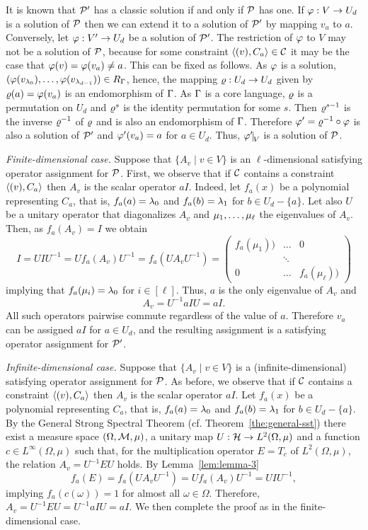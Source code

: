 \documentclass[11pt,letter]{article}
\begin{document}
It is known \cite{Jeavons99:expressive} that ${\mathcal P}'$ has a classic solution if and only if ${\mathcal P}$ has one. If $\varphi:V\to U_d$ is a solution of ${\mathcal P}$ then we can extend it to a solution of ${\mathcal P}'$ by mapping $v_a$ to $a$. Conversely, let $\varphi:V'\to U_d$ be a solution of ${\mathcal P}'$. The restriction of $\varphi$ to $V$ may not be a solution of ${\mathcal P}$, because for some constraint $\langle (v),C_a \rangle\in{\mathcal C}$ it may be the case that $\varphi(v)=\varphi(v_a)\ne a$. This can be fixed as follows.  As $\varphi$ is a solution, $(\varphi(v_{\lambda_0}),\ldots, \varphi(v_{\lambda_{d-1}}))\in R_\Gamma$, hence, the mapping $\varrho:U_d\to U_d$ given by $\varrho(a)=\varphi(v_a)$ is an endomorphism of $\Gamma$.  As $\Gamma$ is a core language, $\varrho$ is a permutation on $U_d$ and $\varrho^s$ is the identity permutation for some $s$. Then $\varrho^{s-1}$ is the inverse $\varrho^{-1}$ of $\varrho$ and is also an endomorphism of $\Gamma$. Therefore $\varphi'=\varrho^{-1}\circ\varphi$ is also a solution of ${\mathcal P}'$ and $\varphi'(v_a)=a$ for $a\in U_d$. Thus, $\vf'\red V$ is a solution of ${\mathcal P}$.

\smallskip

{\it Finite-dimensional case.}
Suppose that $\{A_v\mid v\in V\}$ is an $\ell$-dimensional satisfying operator assignment for ${\mathcal P}$. First, we observe that if ${\mathcal C}$ contains a constraint $\langle (v),C_a \rangle$ then $A_v$ is the scalar operator $aI$. Indeed, let $f_a(x)$ be a polynomial representing $C_a$, that is,  $f_a(a)=\lambda_0$ and $f_a(b)=\lambda_1$ for $b\in U_d-\{a\}$. Let also $U$ be a unitary operator that diagonalizes $A_v$ and $\mu _1,\ldots, \mu _{\ell}$ the eigenvalues of $A_v$. Then, as $f_a(A_v)=I$ we obtain
\[
I=UIU^{-1}=Uf_a(A_v)U^{-1}=f_a(UA_vU^{-1})=
\left(\begin{array}{ccc}f_a(\mu_1))&\dots&0\\ &\ddots&\\ 0&\dots&f_a(\mu_\ell))\end{array}\right)
\]
implying that $f_a(\mu_i)=\lambda_0$ for $i\in[\ell]$. Thus, $a$ is the only eigenvalue of $A_v$ and 
\[
A_v=U^{-1}aIU=aI.
\]
All such operators pairwise commute regardless of the value of $a$. Therefore $v_a$ can be assigned $aI$ for $a\in U_d$, and the resulting assignment is a satisfying operator assignment for ${\mathcal P}'$.

\smallskip

{\it Infinite-dimensional case.}
Suppose that $\{A_v\mid v\in V\}$ is a (infinite-dimensional) satisfying operator assignment for ${\mathcal P}$. As before, we observe that if ${\mathcal C}$ contains a constraint $\langle (v),C_a \rangle$ then $A_v$ is the scalar operator $aI$. Let $f_a(x)$ be a polynomial representing $C_a$, that is,  $f_a(a)=\lambda_0$ and $f_a(b)=\lambda_1$ for $b\in U_d-\{a\}$. By the General Strong Spectral Theorem (cf. Theorem~\ref{the:general-sst}) there exist a measure space $(\Omega,{\mathcal M},\mu)$, a unitary map $U:{\mathcal H}\to L^2(\Omega,\mu)$ and a function $c\in L^\infty(\Omega,\mu)$ such that, for the multiplication operator $E = T_c$ of $L^2(\Omega,\mu)$, the relation $A_v = U^{-1} EU$ holds. By Lemma~\ref{lem:lemma-3} 
\[
f_a(E)=f_a(UA_vU^{-1})=Uf_a(A_v)U^{-1}=UIU^{-1},
\]
implying $f_a(c(\omega))=1$ for almost all $\omega\in\Omega$. Therefore, $A_v=U^{-1}EU=U^{-1}aIU=aI$. We then complete the proof as in the finite-dimensional case.
\end{document}

